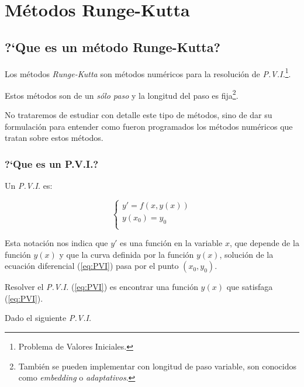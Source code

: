 %
%

\chapter{M\'etodos Runge-Kutta} \label{sec:Runge}

\section{?`Que es un m\'etodo Runge-Kutta?}

Los m\'etodos \emph{Runge-Kutta} son m\'etodos num\'ericos para la resoluci\'on
de \emph{P.V.I.}\footnote{Problema de Valores Iniciales.}.\newline

Estos m\'etodos son de un \emph{s\'olo paso} y la longitud del paso es 
fija\footnote{Tambi\'en se pueden implementar con longitud de paso variable,
son conocidos como \emph{embedding} o \emph{adaptativos}.}.\newline

No trataremos de estudiar con detalle este tipo de m\'etodos, sino de
dar su formulaci\'on para entender como fueron programados los m\'etodos
num\'ericos que tratan sobre estos m\'etodos.
\newpage

\subsection{?`Que es un P.V.I.?}
Un \emph{P.V.I.} es:

\begin{equation} \label{eq:PVI}
\left\{ \begin{array}{l}
y' = f(x, y(x))\\
y(x_0) = y_0\\
\end{array} \right.
\end{equation}

Esta notaci\'on nos indica que $y'$ es una funci\'on en la variable $x$, que
depende de la funci\'on $y(x)$ y que la curva definida por la funci\'on $y(x)$,
soluci\'on de la ecuaci\'on diferencial (\ref{eq:PVI}) pasa por el punto 
$(x_0,y_0)$.\newline

Resolver el \emph{P.V.I.} (\ref{eq:PVI}) es encontrar una funci\'on $y(x)$
que satisfaga (\ref{eq:PVI}).\newline

Dado el siguiente \emph{P.V.I.}

